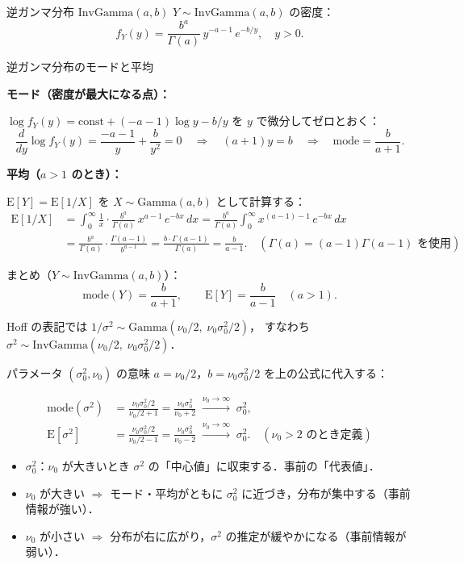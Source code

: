 \documentclass[lualatex,ja=standard,a4paper,12pt]{bxjsarticle}
\begin{document}
\begin{defbox}{逆ガンマ分布 $\mathrm{InvGamma}(a, b)$}
$Y \sim \mathrm{InvGamma}(a, b)$ の密度：
\[
  f_Y(y) = \frac{b^a}{\Gamma(a)}\, y^{-a-1}\, e^{-b/y}, \quad y > 0.
\]
\end{defbox}

\begin{derivbox}{逆ガンマ分布のモードと平均}

\noindent\textbf{モード（密度が最大になる点）：}

$\log f_Y(y) = \mathrm{const} + (-a-1)\log y - b/y$ を $y$ で微分してゼロとおく：
\[
  \frac{d}{dy}\log f_Y(y) = \frac{-a-1}{y} + \frac{b}{y^2} = 0
  \quad\Rightarrow\quad
  (a+1)y = b
  \quad\Rightarrow\quad
  \mathrm{mode} = \frac{b}{a+1}.
\]

\noindent\textbf{平均（$a > 1$ のとき）：}

$\mathrm{E}[Y] = \mathrm{E}[1/X]$ を $X \sim \mathrm{Gamma}(a,b)$ として計算する：
\begin{align*}
  \mathrm{E}[1/X]
  &= \int_0^\infty \frac{1}{x} \cdot \frac{b^a}{\Gamma(a)}\,x^{a-1}\,e^{-bx}\,dx
   = \frac{b^a}{\Gamma(a)} \int_0^\infty x^{(a-1)-1}\,e^{-bx}\,dx \\[4pt]
  &= \frac{b^a}{\Gamma(a)} \cdot \frac{\Gamma(a-1)}{b^{a-1}}
   = \frac{b \cdot \Gamma(a-1)}{\Gamma(a)}
   = \frac{b}{a-1}.
  \quad (\Gamma(a) = (a-1)\Gamma(a-1) \text{ を使用})
\end{align*}

\noindent まとめ（$Y \sim \mathrm{InvGamma}(a,b)$）：
\[
  \mathrm{mode}(Y) = \frac{b}{a+1}, \qquad
  \mathrm{E}[Y] = \frac{b}{a-1} \quad (a > 1).
\]
\end{derivbox}

\medskip
Hoff の表記では $1/\sigma^2 \sim \mathrm{Gamma}(\nu_0/2,\; \nu_0\sigma_0^2/2)$，
すなわち $\sigma^2 \sim \mathrm{InvGamma}(\nu_0/2,\; \nu_0\sigma_0^2/2)$．

\begin{derivbox}{パラメータ $(\sigma_0^2, \nu_0)$ の意味}
$a = \nu_0/2$，$b = \nu_0\sigma_0^2/2$ を上の公式に代入する：

\begin{align*}
  \mathrm{mode}(\sigma^2)
  &= \frac{\nu_0\sigma_0^2/2}{\nu_0/2 + 1}
   = \frac{\nu_0\sigma_0^2}{\nu_0 + 2}
   \;\xrightarrow{\nu_0\to\infty}\; \sigma_0^2, \\[6pt]
  \mathrm{E}[\sigma^2]
  &= \frac{\nu_0\sigma_0^2/2}{\nu_0/2 - 1}
   = \frac{\nu_0\sigma_0^2}{\nu_0 - 2}
   \;\xrightarrow{\nu_0\to\infty}\; \sigma_0^2. \quad (\nu_0 > 2 \text{ のとき定義})
\end{align*}

\begin{itemize}
  \item $\sigma_0^2$：$\nu_0$ が大きいとき $\sigma^2$ の「中心値」に収束する．事前の「代表値」．
  \item $\nu_0$ が大きい $\Rightarrow$ モード・平均がともに $\sigma_0^2$ に近づき，分布が集中する（事前情報が強い）．
  \item $\nu_0$ が小さい $\Rightarrow$ 分布が右に広がり，$\sigma^2$ の推定が緩やかになる（事前情報が弱い）．
\end{itemize}
\end{derivbox}
\end{document}
